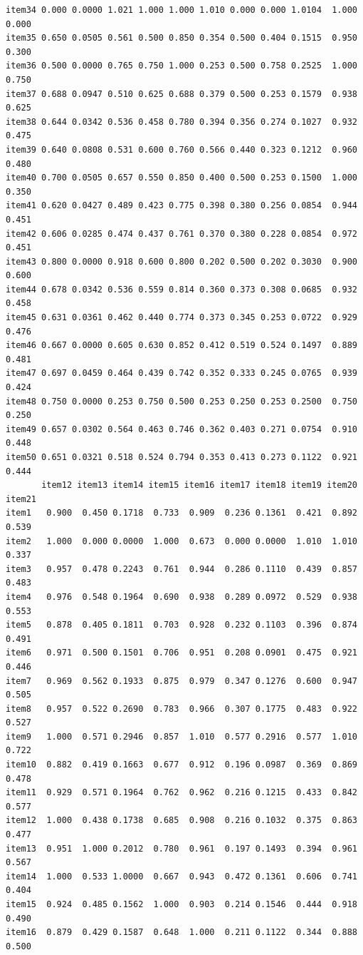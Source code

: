 \documentclass[
  a4paper,
]{ltjsbook}
\begin{document}
\begin{verbatim}
item34 0.000 0.0000 1.021 1.000 1.000 1.010 0.000 0.000 1.0104  1.000  0.000
item35 0.650 0.0505 0.561 0.500 0.850 0.354 0.500 0.404 0.1515  0.950  0.300
item36 0.500 0.0000 0.765 0.750 1.000 0.253 0.500 0.758 0.2525  1.000  0.750
item37 0.688 0.0947 0.510 0.625 0.688 0.379 0.500 0.253 0.1579  0.938  0.625
item38 0.644 0.0342 0.536 0.458 0.780 0.394 0.356 0.274 0.1027  0.932  0.475
item39 0.640 0.0808 0.531 0.600 0.760 0.566 0.440 0.323 0.1212  0.960  0.480
item40 0.700 0.0505 0.657 0.550 0.850 0.400 0.500 0.253 0.1500  1.000  0.350
item41 0.620 0.0427 0.489 0.423 0.775 0.398 0.380 0.256 0.0854  0.944  0.451
item42 0.606 0.0285 0.474 0.437 0.761 0.370 0.380 0.228 0.0854  0.972  0.451
item43 0.800 0.0000 0.918 0.600 0.800 0.202 0.500 0.202 0.3030  0.900  0.600
item44 0.678 0.0342 0.536 0.559 0.814 0.360 0.373 0.308 0.0685  0.932  0.458
item45 0.631 0.0361 0.462 0.440 0.774 0.373 0.345 0.253 0.0722  0.929  0.476
item46 0.667 0.0000 0.605 0.630 0.852 0.412 0.519 0.524 0.1497  0.889  0.481
item47 0.697 0.0459 0.464 0.439 0.742 0.352 0.333 0.245 0.0765  0.939  0.424
item48 0.750 0.0000 0.253 0.750 0.500 0.253 0.250 0.253 0.2500  0.750  0.250
item49 0.657 0.0302 0.564 0.463 0.746 0.362 0.403 0.271 0.0754  0.910  0.448
item50 0.651 0.0321 0.518 0.524 0.794 0.353 0.413 0.273 0.1122  0.921  0.444
       item12 item13 item14 item15 item16 item17 item18 item19 item20 item21
item1   0.900  0.450 0.1718  0.733  0.909  0.236 0.1361  0.421  0.892  0.539
item2   1.000  0.000 0.0000  1.000  0.673  0.000 0.0000  1.010  1.010  0.337
item3   0.957  0.478 0.2243  0.761  0.944  0.286 0.1110  0.439  0.857  0.483
item4   0.976  0.548 0.1964  0.690  0.938  0.289 0.0972  0.529  0.938  0.553
item5   0.878  0.405 0.1811  0.703  0.928  0.232 0.1103  0.396  0.874  0.491
item6   0.971  0.500 0.1501  0.706  0.951  0.208 0.0901  0.475  0.921  0.446
item7   0.969  0.562 0.1933  0.875  0.979  0.347 0.1276  0.600  0.947  0.505
item8   0.957  0.522 0.2690  0.783  0.966  0.307 0.1775  0.483  0.922  0.527
item9   1.000  0.571 0.2946  0.857  1.010  0.577 0.2916  0.577  1.010  0.722
item10  0.882  0.419 0.1663  0.677  0.912  0.196 0.0987  0.369  0.869  0.478
item11  0.929  0.571 0.1964  0.762  0.962  0.216 0.1215  0.433  0.842  0.577
item12  1.000  0.438 0.1738  0.685  0.908  0.216 0.1032  0.375  0.863  0.477
item13  0.951  1.000 0.2012  0.780  0.961  0.197 0.1493  0.394  0.961  0.567
item14  1.000  0.533 1.0000  0.667  0.943  0.472 0.1361  0.606  0.741  0.404
item15  0.924  0.485 0.1562  1.000  0.903  0.214 0.1546  0.444  0.918  0.490
item16  0.879  0.429 0.1587  0.648  1.000  0.211 0.1122  0.344  0.888  0.500

\end{verbatim}
\end{document}
